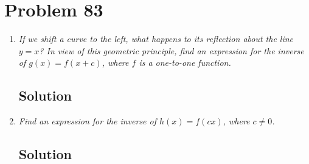 \documentclass[11pt]{article}
\newcommand{\soln}{\subsection*}
\newcommand{\qn}{\textit}
\begin{document}
\section*{Problem 83}

\begin{enumerate}
	\item \qn{If we shift a curve to the left, what happens to its reflection about the line $y=x$? In view of this geometric principle, find an expression for the inverse of $g(x)=f(x+c)$, where $f$ is a one-to-one function.}
	\soln{Solution}
	
	\item \qn{Find an expression for the inverse of $h(x)=f(cx)$, where $c \ne 0$.}
	\soln{Solution}
\end{enumerate}
\end{document}
